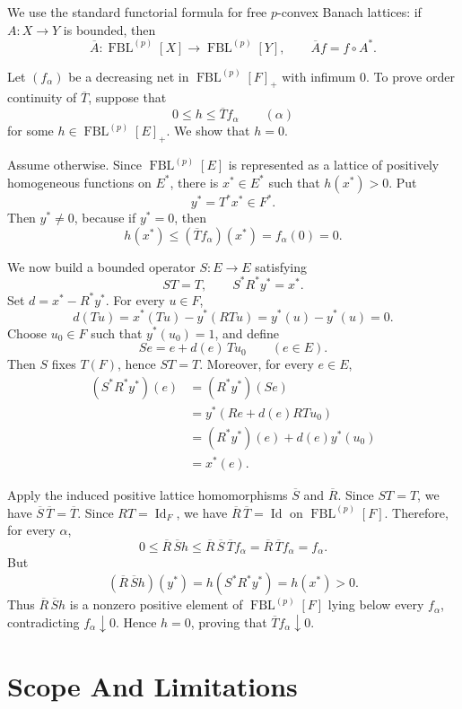 \documentclass[11pt]{article}
\newcommand{\FBL}{\operatorname{FBL}}
\newcommand{\Id}{\operatorname{Id}}
\begin{document}
We use the standard functorial formula for free \(p\)-convex Banach lattices:
if \(A:X\to Y\) is bounded, then
\[
  \overline A:\FBL^{(p)}[X]\to \FBL^{(p)}[Y],
  \qquad
  \overline A f=f\circ A^*.
\]

Let \((f_\alpha)\) be a decreasing net in \(\FBL^{(p)}[F]_+\) with infimum
\(0\).  To prove order continuity of \(\overline T\), suppose that
\[
  0\leq h\leq \overline T f_\alpha
  \qquad(\alpha)
\]
for some \(h\in\FBL^{(p)}[E]_+\).  We show that \(h=0\).

Assume otherwise.  Since \(\FBL^{(p)}[E]\) is represented as a lattice of
positively homogeneous functions on \(E^*\), there is \(x^*\in E^*\) such
that \(h(x^*)>0\).  Put
\[
  y^*=T^*x^*\in F^*.
\]
Then \(y^*\neq0\), because if \(y^*=0\), then
\[
  h(x^*)\leq (\overline T f_\alpha)(x^*)=f_\alpha(0)=0.
\]

We now build a bounded operator \(S:E\to E\) satisfying
\[
  ST=T,
  \qquad
  S^*R^*y^*=x^*.
\]
Set \(d=x^*-R^*y^*\).  For every \(u\in F\),
\[
  d(Tu)=x^*(Tu)-y^*(RTu)=y^*(u)-y^*(u)=0.
\]
Choose \(u_0\in F\) such that \(y^*(u_0)=1\), and define
\[
  S e=e+d(e)\,T u_0 \qquad(e\in E).
\]
Then \(S\) fixes \(T(F)\), hence \(ST=T\).  Moreover, for every \(e\in E\),
\[
\begin{aligned}
  (S^*R^*y^*)(e)
  &= (R^*y^*)(Se)  \\
  &= y^*(Re+d(e)RTu_0) \\
  &= (R^*y^*)(e)+d(e)y^*(u_0) \\
  &= x^*(e).
\end{aligned}
\]

Apply the induced positive lattice homomorphisms \(\overline S\) and
\(\overline R\).  Since \(ST=T\), we have
\(\overline S\,\overline T=\overline T\).  Since \(RT=\Id_F\), we have
\(\overline R\,\overline T=\Id\) on \(\FBL^{(p)}[F]\).  Therefore, for every
\(\alpha\),
\[
  0\leq \overline R\,\overline S h
  \leq \overline R\,\overline S\,\overline T f_\alpha
  = \overline R\,\overline T f_\alpha
  = f_\alpha.
\]
But
\[
  (\overline R\,\overline S h)(y^*)
  = h(S^*R^*y^*)
  = h(x^*)>0.
\]
Thus \(\overline R\,\overline S h\) is a nonzero positive element of
\(\FBL^{(p)}[F]\) lying below every \(f_\alpha\), contradicting
\(f_\alpha\downarrow0\).  Hence \(h=0\), proving that
\(\overline T f_\alpha\downarrow0\).

\section*{Scope And Limitations}
\end{document}
